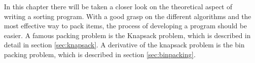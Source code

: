 In this chapter there will be taken a closer look on the theoretical aspect of writing a sorting program.
With a good grasp on the different algorithms and the most effective way to pack items, the process of developing a program should be easier. A famous packing problem is the Knapsack problem, which is described in detail in section \ref{sec:knapsack}. A derivative of the knapsack problem is the bin packing problem, which is described in section \ref{sec:binpacking}.